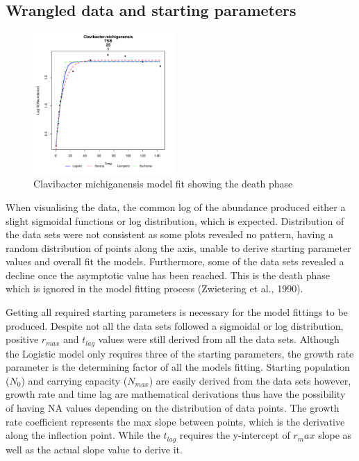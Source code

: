\subsection{Wrangled data and starting parameters}
\begin{figure}
    \begin{center}
        \includegraphics[width=0.48\textwidth]{../Results/Cmichiganensis25_fit.pdf}
    \end{center}
    \caption{Clavibacter michiganensis model fit showing the death phase}
    \label{fig:Clavibacter michiganensis}
\end{figure}

When visualising the data, the common log of the abundance produced either a slight sigmoidal functions or log distribution, which is expected. Distribution of the data sets were not consistent as some plots revealed no pattern, having a random distribution of points along the axis, unable to derive starting parameter values and overall fit the models. Furthermore, some of the data sets revealed a decline once the asymptotic value has been reached. This is the death phase which is ignored in the model fitting process (Zwietering et al., 1990).

Getting all required starting parameters is necessary for the model fittings to be produced. Despite not all the data sets followed a sigmoidal or log distribution, positive $r_{max}$ and  $t_{lag}$ values were still derived from all the data sets. Although the Logistic model only requires three of the starting parameters, the growth rate parameter is the determining factor of all the models fitting. Starting population ($N_0$) and carrying capacity ($N_{max}$) are easily derived from the data sets however, growth rate and time lag are mathematical derivations thus have the possibility of having NA values depending on the distribution of data points. The growth rate coefficient represents the max slope between points, which is the derivative along the inflection point. While the $t_{lag}$ requires the y-intercept of $r_max$ slope as well as the actual slope value to derive it.

